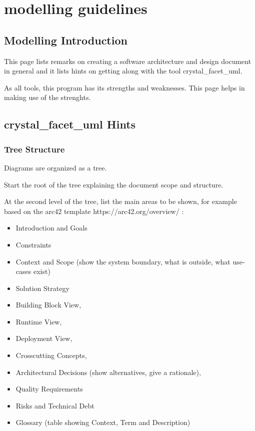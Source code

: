 \chapter{modelling guidelines}
\label{modelling-guidelines}

\section{Modelling Introduction}
\label{cfu-modelling-intro}

This page lists remarks on creating a software architecture and design document in general
and it lists hints on getting along with the tool crystal\_facet\_uml.

As all tools, this program has its strengths and weaknesses.
This page helps in making use of the strenghts.

\section{crystal\_facet\_uml Hints}
\label{cfu-modelling-tool-hints}

\subsection{Tree Structure}

Diagrams are organized as a tree.

Start the root of the tree explaining the document scope and structure.

At the second level of the tree, list the main areas to be shown,
for example based on the arc42 template https://arc42.org/overview/ :

\begin{itemize}
\item Introduction and Goals
\item Constraints
\item Context and Scope (show the system boundary, what is outside, what use-cases exist)
\item Solution Strategy
\item Building Block View,
\item Runtime View,
\item Deployment View,
\item Crosscutting Concepts,
\item Architectural Decisions (show alternatives, give a rationale),
\item Quality Requirements
\item Risks and Technical Debt
\item Glossary (table showing Context, Term and Description)
\end{itemize}

